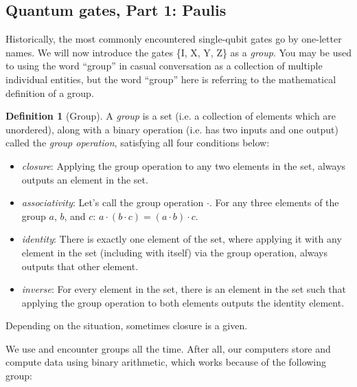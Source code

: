 \documentclass{article}
\theoremstyle{definition}
\newtheorem{definition}{Definition}
\begin{document}
\subsection{Quantum gates, Part 1: Paulis}
Historically, the most commonly encountered single-qubit gates go by one-letter names.
We will now introduce the gates \{I, X, Y, Z\} as a \textit{group}.
You may be used to using the word ``group'' in casual conversation as a collection of multiple individual entities, but the word ``group'' here is referring to the mathematical definition of a group.

\begin{definition}[Group]
	A \textit{group} is a set (i.e. a collection of elements which are unordered), along with a binary operation (i.e. has two inputs and one output) called the \textit{group operation}, satisfying all four conditions below:
	\begin{itemize}
		\item \textit{closure}: Applying the group operation to any two elements in the set, always outputs an element in the set.
		\item \textit{associativity}: Let's call the group operation $\cdot$.  For any three elements of the group $a$, $b$, and $c$: $a \cdot (b \cdot c) = (a \cdot b) \cdot c$.
		\item \textit{identity}: There is exactly one element of the set, where applying it with any element in the set (including with itself) via the group operation, always outputs that other element.
		\item \textit{inverse}: For every element in the set, there is an element in the set such that applying the group operation to both elements outputs the identity element.
	\end{itemize}
\end{definition}
Depending on the situation, sometimes closure is a given.

We use and encounter groups all the time.  After all, our computers store and compute data using binary arithmetic, which works because of the following group:
\end{document}
